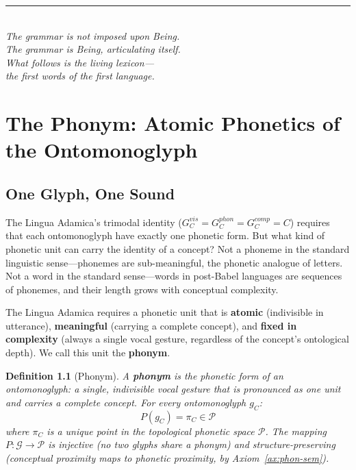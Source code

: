 \documentclass[12pt, letterpaper]{book}
\def\equiv{=}%
\def\mathfrak#1{#1}%
\newtheorem{definition}{Definition}[chapter]
\begin{document}
\vspace{1cm}
\begin{center}
\rule{4cm}{0.4pt}\\[0.5cm]
\textit{The grammar is not imposed upon Being.\\
The grammar is Being, articulating itself.\\[0.3cm]
What follows is the living lexicon---\\
the first words of the first language.}
\end{center}


\chapter{The Phonym: Atomic Phonetics of the Ontomonoglyph}

\section{One Glyph, One Sound}

The Lingua Adamica's trimodal identity ($G_C^{vis} \equiv G_C^{phon} \equiv G_C^{comp} \equiv C$) requires that each ontomonoglyph have exactly one phonetic form. But what kind of phonetic unit can carry the identity of a concept? Not a phoneme in the standard linguistic sense---phonemes are sub-meaningful, the phonetic analogue of letters. Not a word in the standard sense---words in post-Babel languages are sequences of phonemes, and their length grows with conceptual complexity.

The Lingua Adamica requires a phonetic unit that is \textbf{atomic} (indivisible in utterance), \textbf{meaningful} (carrying a complete concept), and \textbf{fixed in complexity} (always a single vocal gesture, regardless of the concept's ontological depth). We call this unit the \textbf{phonym}.

\begin{definition}[Phonym]\label{def:phonym}
A \textbf{phonym} is the phonetic form of an ontomonoglyph: a single, indivisible vocal gesture that is pronounced as one unit and carries a complete concept. For every ontomonoglyph $\mathfrak{g}_C$:
\[
P(\mathfrak{g}_C) \equiv \pi_C \in \mathcal{P}
\]
where $\pi_C$ is a unique point in the topological phonetic space $\mathcal{P}$. The mapping $P: \mathcal{G} \to \mathcal{P}$ is injective (no two glyphs share a phonym) and structure-preserving (conceptual proximity maps to phonetic proximity, by Axiom~\ref{ax:phon-sem}).
\end{definition}
\end{document}
